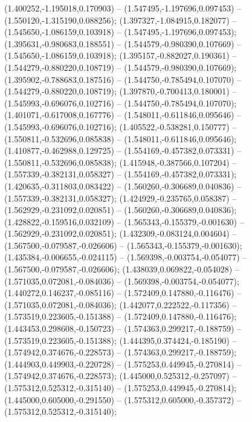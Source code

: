  (1.400252,-1.195018,0.170903) -- (1.547495,-1.197696,0.097453) -- (1.550120,-1.315190,0.088256);
 (1.397327,-1.084915,0.182077) -- (1.545650,-1.086159,0.103918) -- (1.547495,-1.197696,0.097453);
 (1.395631,-0.980683,0.188551) -- (1.544579,-0.980390,0.107669) -- (1.545650,-1.086159,0.103918);
 (1.395157,-0.882027,0.190361) -- (1.544279,-0.880220,0.108719) -- (1.544579,-0.980390,0.107669);
 (1.395902,-0.788683,0.187516) -- (1.544750,-0.785494,0.107070) -- (1.544279,-0.880220,0.108719);
 (1.397870,-0.700413,0.180001) -- (1.545993,-0.696076,0.102716) -- (1.544750,-0.785494,0.107070);
 (1.401071,-0.617008,0.167776) -- (1.548011,-0.611846,0.095646) -- (1.545993,-0.696076,0.102716);
 (1.405522,-0.538281,0.150777) -- (1.550811,-0.532696,0.085838) -- (1.548011,-0.611846,0.095646);
 (1.410877,-0.462988,0.129725) -- (1.554169,-0.457382,0.073331) -- (1.550811,-0.532696,0.085838);
 (1.415948,-0.387566,0.107204) -- (1.557339,-0.382131,0.058327) -- (1.554169,-0.457382,0.073331);
 (1.420635,-0.311803,0.083422) -- (1.560260,-0.306689,0.040836) -- (1.557339,-0.382131,0.058327);
 (1.424929,-0.235765,0.058387) -- (1.562929,-0.231092,0.020851) -- (1.560260,-0.306689,0.040836);
 (1.428822,-0.159516,0.032109) -- (1.565343,-0.155379,-0.001630) -- (1.562929,-0.231092,0.020851);
 (1.432309,-0.083124,0.004604) -- (1.567500,-0.079587,-0.026606) -- (1.565343,-0.155379,-0.001630);
 (1.435384,-0.006655,-0.024115) -- (1.569398,-0.003754,-0.054077) -- (1.567500,-0.079587,-0.026606);
 (1.438039,0.069822,-0.054028) -- (1.571035,0.072081,-0.084036) -- (1.569398,-0.003754,-0.054077);
 (1.440272,0.146237,-0.085116) -- (1.572409,0.147880,-0.116476) -- (1.571035,0.072081,-0.084036);
 (1.442077,0.222522,-0.117356) -- (1.573519,0.223605,-0.151388) -- (1.572409,0.147880,-0.116476);
 (1.443453,0.298608,-0.150723) -- (1.574363,0.299217,-0.188759) -- (1.573519,0.223605,-0.151388);
 (1.444395,0.374424,-0.185190) -- (1.574942,0.374676,-0.228573) -- (1.574363,0.299217,-0.188759);
 (1.444903,0.449903,-0.220728) -- (1.575253,0.449945,-0.270814) -- (1.574942,0.374676,-0.228573);
 (1.445000,0.525312,-0.257097) -- (1.575312,0.525312,-0.315140) -- (1.575253,0.449945,-0.270814);
 (1.445000,0.605000,-0.291550) -- (1.575312,0.605000,-0.357372) -- (1.575312,0.525312,-0.315140);
